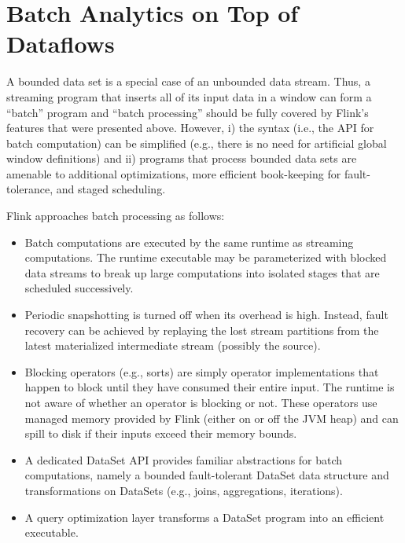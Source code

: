 \documentclass[11pt]{article}
\begin{document}

\section{Batch Analytics on Top of Dataflows}
\label{sec:batch}
\vspace{-3mm}
A bounded data set is a special case of an unbounded data stream. Thus, a streaming program that inserts all of its input data in a window can form a “batch” program and “batch processing” should be fully covered by Flink's features that were presented above. However, i) the syntax (i.e., the API for batch computation) can be simplified (e.g., there is no need for artificial global window definitions) and ii) programs that process bounded data sets are amenable to additional optimizations, more efficient book-keeping for fault-tolerance, and staged scheduling.

\vspace{2mm}
\noindent Flink approaches batch processing as follows:\vspace{-3mm}
\begin{itemize}
	\item Batch computations are executed by the same runtime as streaming computations. The runtime executable may be parameterized with blocked data streams to break up large computations into isolated stages that are scheduled successively. \vspace{-3mm}
	\item Periodic snapshotting is turned off when its overhead is high. Instead, fault recovery can be achieved by replaying the lost stream partitions from the latest materialized intermediate stream (possibly the source).\vspace{-3mm}
	\item Blocking operators (e.g., sorts) are simply operator implementations that happen to block until they have consumed their entire input. The runtime is not aware of whether an operator is blocking or not. These operators use managed memory provided by Flink (either on or off the JVM heap) and can spill to disk if their inputs exceed their memory bounds.\vspace{-3mm}
	\item A dedicated DataSet API provides familiar abstractions for batch computations, namely a bounded fault-tolerant DataSet data structure and transformations on DataSets (e.g., joins, aggregations, iterations).\vspace{-3mm}
	\item A query optimization layer transforms a DataSet program into an efficient executable.\vspace{-3mm}
\end{itemize}
\end{document}
